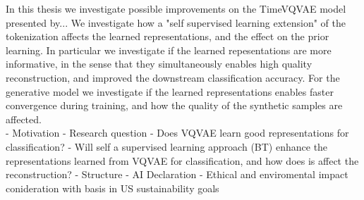 \documentclass[../../thesis.tex]{subfiles}
\begin{document}
In this thesis we investigate possible improvements on the TimeVQVAE model presented by... We investigate how a "self supervised learning extension" of the tokenization affects the learned representations, and the effect on the prior learning. In particular we investigate if the learned repesentations are more informative, in the sense that they simultaneously enables high quality reconstruction, and improved the downstream classification accuracy. For the generative model we investigate if the learned representations enables faster convergence during training, and how the quality of the synthetic samples are affected. \\


- Motivation
- Research question
	- Does VQVAE learn good representations for classification?
	- Will self a supervised learning approach (BT) enhance the representations learned from VQVAE for classification, and how does is affect the reconstruction?
- Structure
- AI Declaration
- Ethical and enviromental impact conideration with basis in US sustainability goals
\end{document}
